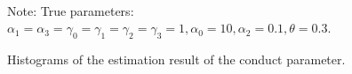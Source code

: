 \documentclass[11pt, a4paper]{article}
\begin{document}
\begin{figure}[!htbp]
  \begin{center}
  \\
  \caption{Histograms of the estimation result of the conduct parameter.}
  \label{fg:histogram_loglinear_loglinear_no_constraint} 
  \end{center}
  \footnotesize
  Note: True parameters: $\alpha_1 = \alpha_3 = \gamma_0 = \gamma_1 = \gamma_2  = \gamma_3 = 1, \alpha_0 = 10, \alpha_2 = 0.1,  \theta = 0.3.$
\end{figure}



\end{document}

